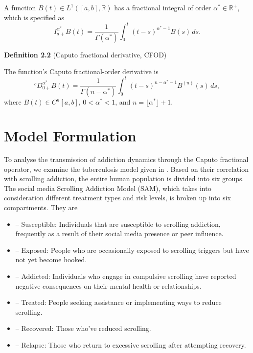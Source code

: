\documentclass[10pt]{NSP1}
\begin{document}
A function $B(t) \in L^{1}([a,b],\mathbb{R})$ has a fractional integral of order $\alpha^{\ast} \in \mathbb{R}^{+}$, which is specified as
\begin{equation}
I_{a+}^{\alpha^{\ast}} B(t) = \frac{1}{\Gamma(\alpha^{\ast})} \int_{0}^{t} (t-s)^{\alpha^{\ast}-1} B(s) \, ds.
\tag{2.1}
\end{equation}

\textbf{Definition 2.2} (Caputo fractional derivative, CFOD)  

The function's Caputo fractional-order derivative is
\begin{equation}
{}^{c}D_{0+}^{\alpha^{\ast}} B(t) = \frac{1}{\Gamma(n-\alpha^{\ast})} \int_{0}^{t} (t-s)^{n-\alpha^{\ast}-1} B^{(n)}(s) \, ds,
\tag{2.2}
\end{equation}
where $B(t) \in C^{n}[a,b]$, $0 < \alpha^{\ast} < 1$, and $n = \lfloor \alpha^{\ast} \rfloor + 1$.

\section{Model Formulation}

To analyse the transmission of addiction dynamics through the Caputo fractional operator, we examine the tuberculosis model given in \cite{ref10}. Based on their correlation with scrolling addiction, the entire human population is divided into six groups. The social media Scrolling Addiction Model (SAM), which takes into consideration different treatment types and risk levels, is broken up into six compartments. They are

\begin{itemize}
\item[$S(t)$] – Susceptible: Individuals that are susceptible to scrolling addiction, frequently as a result of their social media presence or peer influence.
\item[$E(t)$] – Exposed: People who are occasionally exposed to scrolling triggers but have not yet become hooked.
\item[$I(t)$] – Addicted: Individuals who engage in compulsive scrolling have reported negative consequences on their mental health or relationships.
\item[$T(t)$] – Treated: People seeking assistance or implementing ways to reduce scrolling.
\item[$R(t)$] – Recovered: Those who've reduced scrolling.
\item[$L(t)$] – Relapse: Those who return to excessive scrolling after attempting recovery.
\end{itemize}
\end{document}
